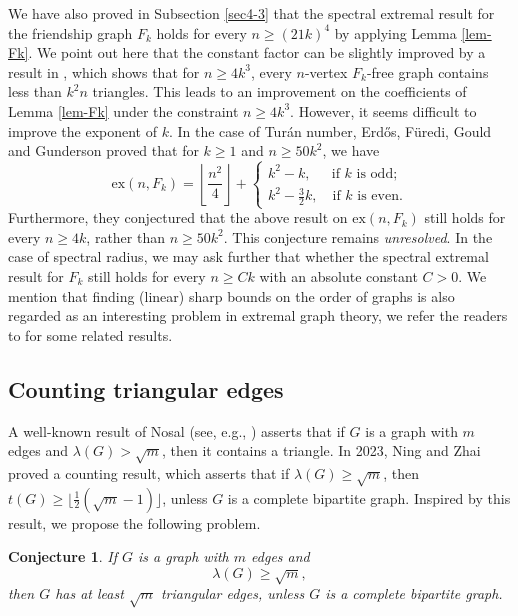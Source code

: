 \documentclass[11pt]{article}
\newtheorem{conjecture}[theorem]{Conjecture}
\begin{document}
\medskip 
We have also proved in Subsection \ref{sec4-3}  that the spectral extremal result \cite[Theorem 2]{CFTZ20} for the friendship graph $F_k$ holds for every $n\ge (21k)^4$ by applying  Lemma \ref{lem-Fk}. We point out here that the constant factor can be slightly improved by a  result in \cite[Theorem 4]{Zhu2023}, which shows that for $n\ge 4k^3$,  every $n$-vertex $F_k$-free graph  contains less than $k^2n$ triangles. 
This leads to an improvement on the coefficients of Lemma \ref{lem-Fk} under the constraint $n\ge 4k^3$. 
 However, it seems difficult to improve the exponent of $k$. 
In the case of Tur\'{a}n number, 
 Erd\H{o}s,  F\"{u}redi, Gould and Gunderson \cite{Erdos95}  
 proved that for $k\ge 1$ and $n\ge 50k^2$, we have 
 \[ \mathrm{ex}(n, F_k)= \left\lfloor \frac {n^2}{4}\right \rfloor+ \left\{
  \begin{array}{ll}
   k^2-k, \quad~~  \mbox{if $k$ is odd;} \\
    k^2-\frac32 k, \quad \mbox{if $k$ is even}.
  \end{array}
\right. \] 
 Furthermore, they conjectured \cite[page 90]{Erdos95} 
 that the above result on $\mathrm{ex}(n,F_k)$ still holds for every $n\ge 4k$, rather than $n\ge 50k^2$. 
 This conjecture remains {\it unresolved}. 
 In the case of spectral radius,  
we may ask further that whether the spectral extremal result for $F_k$ still holds for every $n\ge Ck$ with an absolute constant $C>0$. 
We mention that finding (linear) sharp bounds on the order of graphs is also regarded as an interesting problem in extremal graph theory, we refer the readers to \cite{FG2015cpc, LN2021outplanar, ZL2022jgt} for some related results.



\subsection{Counting triangular edges} 
A well-known result of Nosal \cite{Nosal1970} 
(see, e.g., \cite{Niki2002cpc,Ning2017-ars}) 
asserts that if $G$ is a  graph with
$m$ edges and $\lambda (G) > \sqrt{m}$,
then it contains a triangle.
In 2023, Ning and Zhai \cite{NZ2021}
proved a counting result, which asserts that if
$  \lambda (G)\ge \sqrt{m}$, 
then $t(G)\ge \lfloor \frac{1}{2}(\sqrt{m}-1) \rfloor$, unless $G$ is a complete bipartite graph. 
Inspired by this result, 
we propose the following problem. 


\begin{conjecture} \label{thm-main2}
If $G$ is a graph with $m$ edges and 
\[  \lambda (G) \ge \sqrt{m} , \]
then $G$ has at least $\sqrt{m}$ triangular edges, unless 
$G$ is a complete bipartite graph. 
\end{conjecture}
\end{document}
